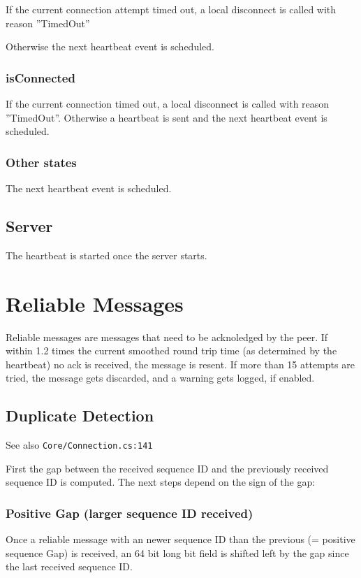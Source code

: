 If the current connection attempt timed out, a local disconnect is called with reason ''TimedOut''

Otherwise the next heartbeat event is scheduled.

\subsubsection{isConnected}

If the current connection timed out, a local disconnect is called with reason ''TimedOut''.
Otherwise a heartbeat is sent and the next heartbeat event is scheduled.

\subsubsection{Other states}

The next heartbeat event is scheduled.

\subsection{Server}

The heartbeat is started once the server starts.

\section{Reliable Messages}

Reliable messages are messages that need to be acknoledged by the peer. If within 1.2 times the current smoothed round trip time (as determined by the heartbeat) no ack is received, the message is resent. If more than 15 attempts are tried, the message gets discarded, and a warning gets logged, if enabled.

\subsection{Duplicate Detection}
See also \texttt{Core/Connection.cs:141}

First the gap between the received sequence ID and the previously received sequence ID is computed. The next steps depend on the sign of the gap:

\subsubsection{Positive Gap (larger sequence ID received)}

Once a reliable message with an newer sequence ID than the previous (= positive sequence Gap) is received, an 64 bit long bit field is shifted left by the gap since the last received sequence ID.

